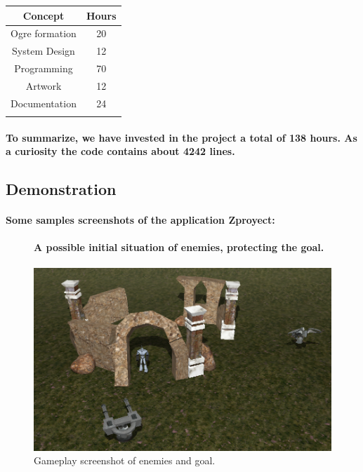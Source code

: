 \documentclass[a4paper,10pt]{article}
\newcommand{\p}[1]{\paragraph{\indent\textnormal{#1}}}
\begin{document}
	    \begin{center}
	     \begin{tabular}{cc}

		\hline
		\textbf{Concept}	& \textbf{Hours} \\
		\hline
		Ogre formation		& 20 \\
		System Design		& 12 \\
		Programming		& 70 \\
		Artwork			& 12 \\
		Documentation		& 24 \\
		\hline
	  \newline    
	     \end{tabular}
	    \end{center}
	  
	  \p{To summarize, we have invested in the project a total of \textbf{138 hours}. As a curiosity the code contains about \textbf{4242 lines}.}


  \subsection{Demonstration}
    \p{Some samples screenshots of the application Zproyect:}

	\begin{figure}[hbt]

	\p{ A possible initial situation of enemies, protecting the goal. \newline}
  
	    \begin{center}
			\includegraphics[scale=.5]{captura1.png}
	    \end{center}
	    \caption{Gameplay screenshot of enemies and goal.}

	\end{figure}
\end{document}
